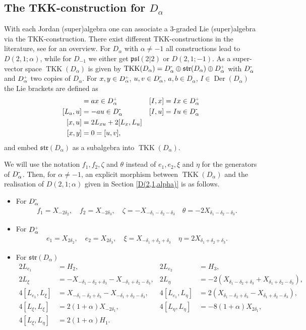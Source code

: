 \documentclass{amsart}
\numberwithin{theorem}{section}
\theoremstyle{definition}
\theoremstyle{remark}
\DeclareMathOperator{\TKK}{TKK}
\newcommand{\mf}[1]{\mathfrak{#1}}
\newcommand{\dea}{{\delta_1}}
\newcommand{\deb}{{\delta_2}}
\newcommand{\dec}{{\delta_3}}
\newcommand{\minus}{\scalebox{0.9}{{\rm -}}}
\newcommand{\plus}{\scalebox{0.6}{{\rm+}}}
\DeclareMathOperator{\Der}{Der}
\begin{document}
\subsection{The TKK-construction for $D_\alpha$}
With each Jordan (super)algebra one can associate a $3$-graded Lie (super)algebra via the TKK-construction. There exist different TKK-constructions in the literature, see \cite{BC2} for an overview. For $D_\alpha$ with $\alpha\neq -1$ all constructions lead to $D(2,1;\alpha)$, while for $D_{-1}$ we either get $\mathfrak{psl}(2|2)$ or $D(2,1;-1)$.
As a super-vector space $\TKK(D_\alpha)$ is given by  $\TKK(D_\alpha)= D_\alpha^{\minus} \oplus \mathfrak{str} (D_\alpha) \oplus D_\alpha^{\plus}$ with $ D_\alpha^{\minus}$ and $ D_\alpha^{\plus}$ two copies of $ D_\alpha$. For $x,y \in D_\alpha^{\plus}$, $u,v\in D_\alpha^{\minus}$, $a,b \in D_\alpha$, $I\in \Der(D_\alpha)$ the Lie brackets are defined as
\begin{align*}
[L_a, x] &= ax \in  D_\alpha^{\plus} & [I,x]&=Ix \in  D_\alpha^{\plus}\\
[L_a, u] &= -au \in  D_\alpha^{\minus} & [I,u]&=Iu \in  D_\alpha^{\minus}\\
[x,u]&=2L_{xu}+2[L_x,L_u] \\
[x,y]&=0=[u,v],
\end{align*}
and embed $\mathfrak{str}(D_\alpha)$ as a subalgebra into $\TKK(D_\alpha)$. 

We will use the notation $f_1, f_2, \zeta$ and $\theta$ instead of $e_1,e_2, \xi$ and $\eta$ for the generators of $D_\alpha^{\minus}$. Then, for $\alpha\not= -1$, an explicit morphism between $\TKK(D_\alpha)$ and the realisation of $D(2,1;\alpha)$ given in Section \ref{D(2,1,alpha)} is as follows.
\begin{itemize}
\item For $D_\alpha^{\minus}$
\begin{align*}
f_1= X_{-2\deb}, \quad f_2= X_{-2\dec}, \quad \zeta=  -X_{-\dea- \deb -\dec} \quad \theta=  -2X_{\dea-\deb-\dec} .
\end{align*}
\item For $D_\alpha^{\plus}$
\begin{align*}
e_1= X_{2\deb}, \quad e_2= X_{2\dec}, \quad \xi =  X_{-\dea+ \deb +\dec} \quad \eta=  2X_{\dea+\deb+\dec} .
\end{align*}
\item For $\mf{str}(D_\alpha)$
\begin{align*}
2L_{e_1} &= H_{2}, & 2L_{e_2} &=H_{3},\\
2L_\xi &= -X_{-\delta_1-\delta_2+\delta_3}-X_{-\delta_1+\delta_2-\delta_3}, & 2L_\eta &= -2(X_{\delta_1-\delta_2+\delta_3}+X_{\delta_1+\delta_2-\delta_3}),\\
4[L_{e_1}, L_\xi] &= X_{-\delta_1-\delta_2+\delta_3}-X_{-\delta_1+\delta_2-\delta_3}, & 4[L_{e_1}, L_\eta] &= 2(X_{\delta_1-\delta_2+\delta_3}-X_{\delta_1+\delta_2-\delta_3}),\\
4[L_\xi, L_\xi] &= 2(1+\alpha)X_{-2\delta_1}, & 4[L_\eta, L_\eta] &= -8(1+\alpha)X_{2\delta_1},\\
4[L_\xi, L_\eta] &= 2(1+\alpha)H_1.
\end{align*}
\end{itemize}
\end{document}
